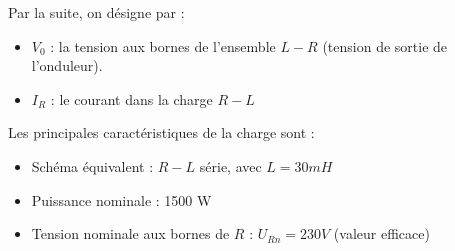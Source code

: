Par la suite, on désigne par :

\begin{itemize}
\setlength\itemsep{-1mm}
\item $V_0$ : la tension aux bornes de l’ensemble $L - R$ (tension de sortie de l’onduleur).
\item $I_R$ : le courant dans la charge $R - L$
\end{itemize}

Les principales caractéristiques de la charge sont :

\begin{itemize}
\setlength\itemsep{-1mm}
\item Schéma équivalent : $R - L$ série, avec $L = 30 mH$
\item Puissance nominale : 1500 W
\item Tension nominale aux bornes de $R$ : $U_{Rn} = 230 V$ (valeur efficace)
\end{itemize}

